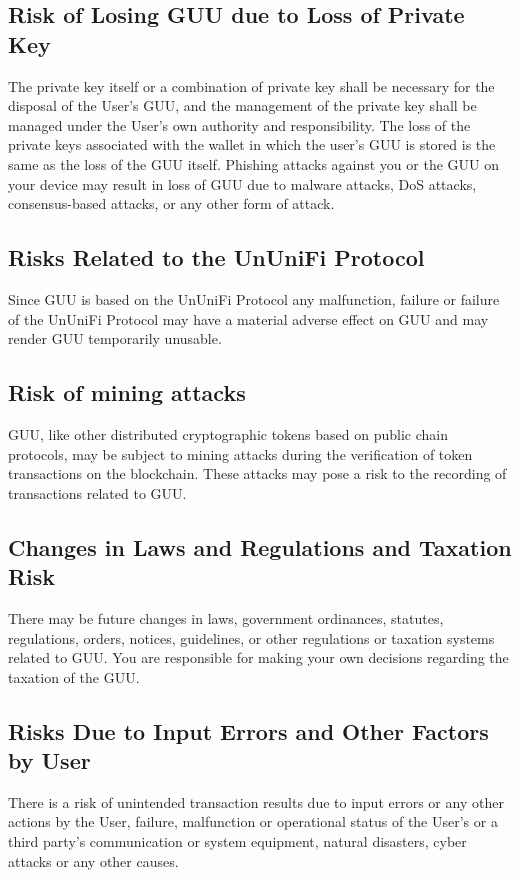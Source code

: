 \documentclass[dvipdfmx]{jsarticle}
\begin{document}
\subsection{Risk of Losing GUU due to Loss of Private Key}
The private key itself or a combination of private key shall be necessary for the disposal of the User's GUU, and the management of the private key shall be managed under the User's own authority and responsibility. 
The loss of the private keys associated with the wallet in which the user's GUU is stored is the same as the loss of the GUU itself. 
Phishing attacks against you or the GUU on your device may result in loss of GUU due to malware attacks, DoS attacks, consensus-based attacks, or any other form of attack.

\subsection{Risks Related to the UnUniFi Protocol}
Since GUU is based on the UnUniFi Protocol any malfunction, failure or failure of the UnUniFi Protocol may have a material adverse effect on GUU and may render GUU temporarily unusable.

\subsection{Risk of mining attacks}
GUU, like other distributed cryptographic tokens based on public chain protocols, may be subject to mining attacks during the verification of token transactions on the blockchain. 
These attacks may pose a risk to the recording of transactions related to GUU.

\subsection{Changes in Laws and Regulations and Taxation Risk}
There may be future changes in laws, government ordinances, statutes, regulations, orders, notices, guidelines, or other regulations or taxation systems related to GUU. 
You are responsible for making your own decisions regarding the taxation of the GUU. 

\subsection{Risks Due to Input Errors and Other Factors by User}
There is a risk of unintended transaction results due to input errors or any other actions by the User, failure, malfunction or operational status of the User's or a third party's communication or system equipment, natural disasters, cyber attacks or any other causes. 
\end{document}
